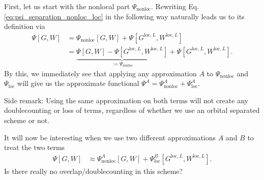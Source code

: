 \documentclass[12pt,a4paper]{scrartcl}
\numberwithin{equation}{section}
\newcommand{\cng}[1]{{\color{red}#1}}
\begin{document}
% 

\bigskip

First, let us start with the nonlocal part $\Psi_{\mathrm{nonloc}}$.
Rewriting Eq. \eqref{eq:psi_separation_nonloc_loc} in the following way naturally
leads us to its definition via
\begin{align}
 \Psi[G,W] &= \Psi_{\mathrm{nonloc}}[G,W] + \Psi_{}[G^{\mathrm{loc},L},W^{\mathrm{loc},L}] \\
 &= \underbrace{\Psi[G,W]- \Psi[G^{\mathrm{loc},L},W^{\mathrm{loc},L}]}_{:=\Psi_{\mathrm{nonloc}}}
    + \Psi_{}[G^{\mathrm{loc},L},W^{\mathrm{loc},L}].
\end{align}
By this, we immediately see that applying any approximation $A$ to $\Psi_{\mathrm{nonloc}}$ and $\Psi_{\mathrm{loc}}$
will give us the approximate functional $\Psi^A = \Psi^A_{\mathrm{nonloc}}+\Psi^A_{\mathrm{loc}}$.

\bigskip

Side remark: Using the same approximation on both terms will not create any doublecounting or loss
of terms, regardless of whether we use an orbital separated scheme or not.

\bigskip

It will now be interesting when we use two different approximations $A$ and $B$
to treat the two terms
\begin{align}
\Psi[G,W] &\approx \Psi^A_{\mathrm{nonloc}}[G,W] + \Psi^B_{\mathrm{loc}}[G^{\mathrm{loc},L},W^{\mathrm{loc},L}] .
\end{align}
\cng{Is there really no overlap/doublecounting in this scheme?}

\bigskip
\end{document}
